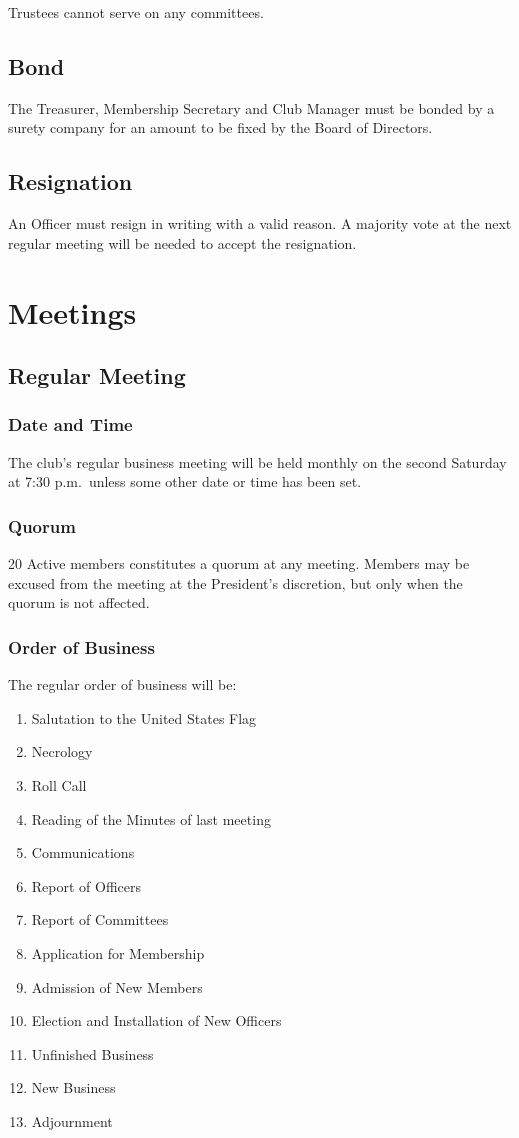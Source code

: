 \documentclass[12pt,letterpaper]{article}
\begin{document}
Trustees cannot serve on any committees.

\subsection{Bond}
The Treasurer, Membership Secretary and Club Manager must be bonded by a surety company for an amount to be fixed by the Board of Directors.

\subsection{Resignation}
An Officer must resign in writing with a valid reason. A majority vote at the next regular meeting will be needed to accept the resignation.

\section{Meetings}

\subsection{Regular Meeting}

\subsubsection{Date and Time}
The club's regular business meeting will be held monthly on the second Saturday at 7:30 p.m.\ unless some other date or time has been set.

\subsubsection{Quorum}
20 Active members constitutes a quorum at any meeting. Members may be excused from the meeting at the President's discretion, but only when the quorum is not affected. 

\subsubsection{Order of Business}
The regular order of business will be: 
\begin{enumerate}
\item Salutation to the United States Flag 
\item Necrology 
\item Roll Call 
\item Reading of the Minutes of last meeting 
\item Communications 
\item Report of Officers 
\item Report of Committees 
\item Application for Membership 
\item Admission of New Members 
\item Election and Installation of New Officers 
\item Unfinished Business 
\item New Business 
\item Adjournment 
\end{enumerate}
\end{document}
